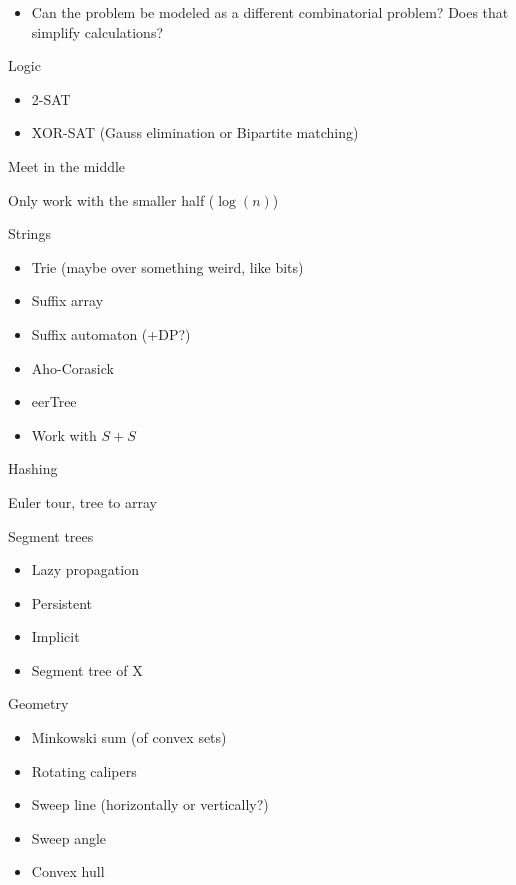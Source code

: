 \begin{myitemize}
\begin{itemize}
\begin{itemize}
            \end{itemize}
          \item Can the problem be modeled as a different combinatorial problem? Does that simplify calculations?
        \end{itemize}
      \item Logic
        \begin{itemize}
          \item 2-SAT
          \item XOR-SAT (Gauss elimination or Bipartite matching)
        \end{itemize}
      \item Meet in the middle
      \item Only work with the smaller half ($\log(n)$)
      \item Strings
        \begin{itemize}
          \item Trie (maybe over something weird, like bits)
          \item Suffix array
          \item Suffix automaton (+DP?)
          \item Aho-Corasick
          \item eerTree
          \item Work with $S+S$
        \end{itemize}
      \item Hashing
      \item Euler tour, tree to array
      \item Segment trees
        \begin{itemize}
          \item Lazy propagation
          \item Persistent
          \item Implicit
          \item Segment tree of X
        \end{itemize}
      \item Geometry
        \begin{itemize}
          \item Minkowski sum (of convex sets)
          \item Rotating calipers
          \item Sweep line (horizontally or vertically?)
          \item Sweep angle
          \item Convex hull
        \end{itemize}

\end{myitemize}
